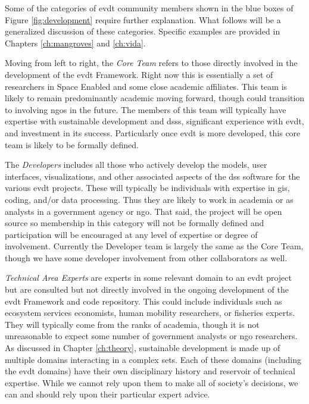 Some of the categories of \ac{evdt} community members shown in the blue boxes of Figure \ref{fig:development} require further explanation. What follows will be a generalized discussion of these categories. Specific examples are provided in Chapters \ref{ch:mangroves} and \ref{ch:vida}.

Moving from left to right, the \textit{Core Team} refers to those directly involved in the development of the \ac{evdt} Framework. Right now this is essentially a set of researchers in Space Enabled and some close academic affiliates. This team is likely to remain predominantly academic moving forward, though could transition to involving \acp{ngo} in the future. The members of this team will typically have expertise with sustainable development and \acp{dss}, significant experience with \ac{evdt}, and investment in its success. Particularly once \ac{evdt} is more developed, this core team is likely to be formally defined.

The \textit{Developers} includes all those who actively develop the models, user interfaces, visualizations, and other associated aspects of the \ac{dss} software for the various \ac{evdt} projects. These will typically be individuals with expertise in \ac{gis}, coding, and/or data processing. Thus they are likely to work in academia or as analysts in a government agency or \ac{ngo}. That said, the project will be open source so membership in this category will not be formally defined and participation will be encouraged at any level of expertise or degree of involvement. Currently the Developer team is largely the same as the Core Team, though we have some developer involvement from other collaborators as well.

\textit{Technical Area Experts} are experts in some relevant domain to an \ac{evdt} project but are consulted but not directly involved in the ongoing development of the \ac{evdt} Framework and code repository. This could include individuals such as ecosystem services economists, human mobility researchers, or fisheries experts. They will typically come from the ranks of academia, though it is not unreasonable to expect some number of government analysts or \ac{ngo} researchers. As discussed in Chapter \ref{ch:theory}, sustainable development is made up of multiple domains interacting in a complex \ac{sets}. Each of these domains (including the \ac{evdt} domains) have their own disciplinary history and reservoir of technical expertise. While we cannot rely upon them to make all of society's decisions, we can and should rely upon their particular expert advice. 

